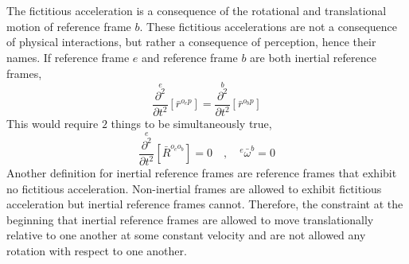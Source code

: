 \documentclass[class=report, 12pt, crop=false]{standalone}
\begin{document}
\begin{center}
\\~\\The fictitious acceleration is a consequence of the rotational and translational motion of reference frame $b$. These fictitious accelerations are not a consequence of physical interactions, but rather a consequence of perception, hence their names. If reference frame $e$ and reference frame $b$ are both inertial reference frames, 
$$\overset{e}{\frac{\partial^{2}}{\partial t^{2}}}[\bar{r}^{o_{e}p}] =  \overset{b}{\frac{\partial^{2}}{\partial t^{2}}}[\bar{r}^{o_{b}p}]$$
This would require $2$ things to be simultaneously true,
$$\overset{e}{\frac{\partial^{2}}{\partial t^{2}}}[\bar{R}^{o_{e}o_{b}}] = 0 \quad,\quad {}^{e}\bar{\omega}^{b} = 0$$
Another definition for inertial reference frames are reference frames that exhibit no fictitious acceleration. Non-inertial frames are allowed to exhibit fictitious acceleration but inertial reference frames cannot. Therefore, the constraint at the beginning that inertial reference frames are allowed to move translationally relative to one another at some constant velocity and are not allowed any rotation with respect to one another.


\end{center}
\end{document}

